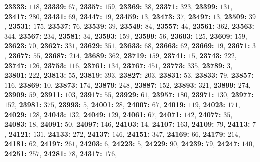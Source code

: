 \textsf{\bfseries 23333:} $118$, \textsf{\bfseries 23339:} $67$, \textsf{\bfseries 23357:} $159$, \textsf{\bfseries 23369:} $38$, \textsf{\bfseries 23371:} $323$, \textsf{\bfseries 23399:} $131$, \textsf{\bfseries 23417:} $280$, \textsf{\bfseries 23431:} $69$, \textsf{\bfseries 23447:} $19$, \textsf{\bfseries 23459:} $13$, \textsf{\bfseries 23473:} $37$, \textsf{\bfseries 23497:} $13$, \textsf{\bfseries 23509:} $39$, \textsf{\bfseries 23531:} $175$, \textsf{\bfseries 23537:} $76$, \textsf{\bfseries 23539:} $39$, \textsf{\bfseries 23549:} $84$, \textsf{\bfseries 23557:} $44$, \textsf{\bfseries 23561:} $362$, \textsf{\bfseries 23563:} $344$, \textsf{\bfseries 23567:} $234$, \textsf{\bfseries 23581:} $34$, \textsf{\bfseries 23593:} $159$, \textsf{\bfseries 23599:} $56$, \textsf{\bfseries 23603:} $125$, \textsf{\bfseries 23609:} $159$, \textsf{\bfseries 23623:} $70$, \textsf{\bfseries 23627:} $331$, \textsf{\bfseries 23629:} $351$, \textsf{\bfseries 23633:} $68$, \textsf{\bfseries 23663:} $62$, \textsf{\bfseries 23669:} $19$, \textsf{\bfseries 23671:} $3$, \textsf{\bfseries 23677:} $55$, \textsf{\bfseries 23687:} $214$, \textsf{\bfseries 23689:} $362$, \textsf{\bfseries 23719:} $159$, \textsf{\bfseries 23741:} $15$, \textsf{\bfseries 23743:} $222$, \textsf{\bfseries 23747:} $126$, \textsf{\bfseries 23753:} $116$, \textsf{\bfseries 23761:} $134$, \textsf{\bfseries 23767:} $451$, \textsf{\bfseries 23773:} $335$, \textsf{\bfseries 23789:} $3$, \textsf{\bfseries 23801:} $222$, \textsf{\bfseries 23813:} $55$, \textsf{\bfseries 23819:} $393$, \textsf{\bfseries 23827:} $203$, \textsf{\bfseries 23831:} $53$, \textsf{\bfseries 23833:} $79$, \textsf{\bfseries 23857:} $116$, \textsf{\bfseries 23869:} $10$, \textsf{\bfseries 23873:} $174$, \textsf{\bfseries 23879:} $248$, \textsf{\bfseries 23887:} $152$, \textsf{\bfseries 23893:} $321$, \textsf{\bfseries 23899:} $274$, \textsf{\bfseries 23909:} $59$, \textsf{\bfseries 23911:} $103$, \textsf{\bfseries 23917:} $55$, \textsf{\bfseries 23929:} $61$, \textsf{\bfseries 23957:} $180$, \textsf{\bfseries 23971:} $130$, \textsf{\bfseries 23977:} $152$, \textsf{\bfseries 23981:} $375$, \textsf{\bfseries 23993:} $5$, \textsf{\bfseries 24001:} $28$, \textsf{\bfseries 24007:} $67$, \textsf{\bfseries 24019:} $119$, \textsf{\bfseries 24023:} $171$, \textsf{\bfseries 24029:} $128$, \textsf{\bfseries 24043:} $132$, \textsf{\bfseries 24049:} $129$, \textsf{\bfseries 24061:} $67$, \textsf{\bfseries 24071:} $142$, \textsf{\bfseries 24077:} $35$, \textsf{\bfseries 24083:} $18$, \textsf{\bfseries 24091:} $50$, \textsf{\bfseries 24097:} $146$, \textsf{\bfseries 24103:} $14$, \textsf{\bfseries 24107:} $163$, \textsf{\bfseries 24109:} $79$, \textsf{\bfseries 24113:} $7$, \textsf{\bfseries 24121:} $131$, \textsf{\bfseries 24133:} $272$, \textsf{\bfseries 24137:} $146$, \textsf{\bfseries 24151:} $347$, \textsf{\bfseries 24169:} $66$, \textsf{\bfseries 24179:} $214$, \textsf{\bfseries 24181:} $62$, \textsf{\bfseries 24197:} $261$, \textsf{\bfseries 24203:} $6$, \textsf{\bfseries 24223:} $5$, \textsf{\bfseries 24229:} $90$, \textsf{\bfseries 24239:} $79$, \textsf{\bfseries 24247:} $140$, \textsf{\bfseries 24251:} $257$, \textsf{\bfseries 24281:} $78$, \textsf{\bfseries 24317:} $176$, 
